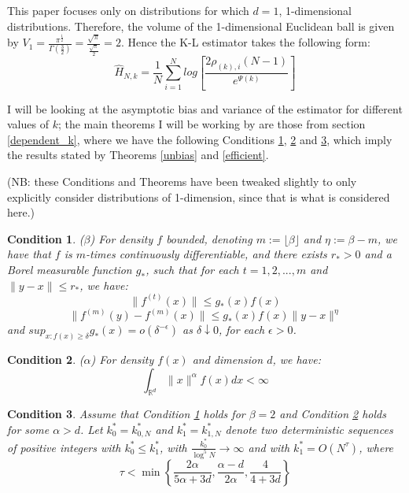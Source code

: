 \documentclass[12pt]{report}
\newtheorem{remark}{Condition}
\begin{document}
This paper focuses only on distributions for which $d =1$, 1-dimensional distributions. Therefore, the volume of the 1-dimensional Euclidean ball is given by $V_{1} = \frac{\pi^{\frac{1}{2}}}{\Gamma (\frac{3}{2})} = \frac{\sqrt{\pi}}{\frac{\sqrt{\pi}}{2}} = 2$. Hence the K-L estimator takes the following form:
\begin{equation} \label{KLest_d=1}
\hat{H}_{N, k} = \frac{1}{N} \sum_{i=1}^{N} log \left[ \frac{2\rho_{(k),i}(N-1)}{e^{\Psi(k)}} \right]
\end{equation}

I will be looking at the asymptotic bias and variance of the estimator for different values of $k$; the main theorems I will be working by are those from section \ref{dependent_k}, where we have the following Conditions \ref{A1}, \ref{A2} and \ref{A3}, which imply the results stated by Theorems \ref{unbias} and \ref{efficient}.

(NB: these Conditions and Theorems have been tweaked slightly to only explicitly consider distributions of 1-dimension, since that is what is considered here.)

\begin{remark} ($\beta$) \label{A1}
For density $f$ bounded, denoting $m := \lfloor \beta \rfloor$ and $\eta := \beta -m$, we have that $f$ is $m$-times continuously differentiable, and there exists $r_{*} > 0$ and a Borel measurable function $g_{*}$, such that for each $t = 1, 2, ... , m$ and $\|y-x\| \leq r_{*}$, we have:
\begin{equation}
\| f^{(t)} (x) \| \leq g_{*}(x)f(x) \nonumber
\end{equation}
\begin{equation}
\| f^{(m)} (y) - f^{(m)} (x) \| \leq g_{*}(x)f(x) \|y-x\|^{\eta} \nonumber
\end{equation}
and $sup_{x:f(x)\geq \delta} g_{*}(x) = o(\delta^{-\epsilon})$ as $\delta \downarrow 0$, for each $\epsilon > 0$.
\end{remark}

\begin{remark} ($\alpha$) \label{A2}
For density $f(x)$ and dimension $d$, we have:
\begin{equation}
\int_{\mathbb{R}^{d}} \| x \|^{\alpha} f(x) dx < \infty \nonumber
\end{equation}
\end{remark}

\begin{remark} \label{A3}
Assume that Condition \ref{A1} holds for $\beta = 2$ and Condition \ref{A2} holds for some $\alpha > d$. Let $k_{0}^{*} = k_{0, N}^{*}$ and $k_{1}^{*} = k_{1, N}^{*}$ denote two deterministic sequences of positive integers with $k_{0}^{*} \leq k_{1}^{*}$, with $\frac{k_{0}^{*}}{\log^{5}{N}} \to \infty$ and with $k_{1}^{*} = O(N^{\tau})$, where
\begin{equation}
\tau < \min \left\{ \frac{2 \alpha}{5 \alpha + 3d} , \frac{\alpha - d}{2 \alpha} , \frac{4}{4 + 3d} \right\} \nonumber
\end{equation}
\end{remark}
\end{document}
